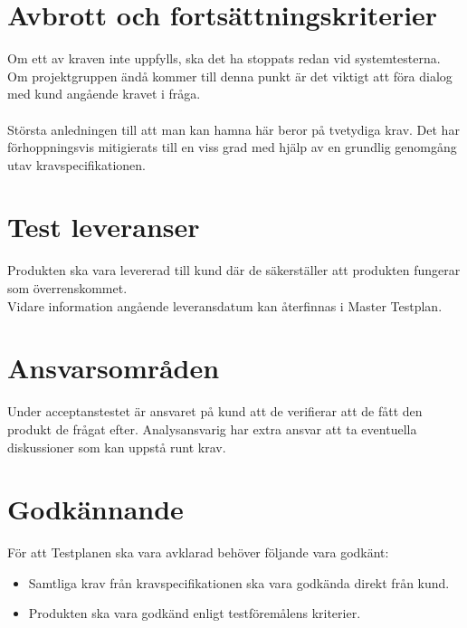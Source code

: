 \documentclass[10pt]{article}
\begin{document}
\section{Avbrott och fortsättningskriterier}
	Om ett av kraven inte uppfylls, ska det ha stoppats redan vid systemtesterna. Om projektgruppen ändå kommer till denna punkt är det viktigt att föra dialog med kund angående kravet i fråga.\\
	\\
	Största anledningen till att man kan hamna här beror på tvetydiga krav. Det har förhoppningsvis mitigierats till en viss grad med hjälp av en grundlig genomgång utav kravspecifikationen.


\section{Test leveranser }
	Produkten ska vara levererad till kund där de säkerställer att produkten fungerar som överrenskommet.
\\	
	Vidare information angående leveransdatum kan återfinnas i Master Testplan.
	

	
\section{Ansvarsområden}
	Under acceptanstestet är ansvaret på kund att de verifierar att de fått den produkt de frågat efter. Analysansvarig har extra ansvar att ta eventuella diskussioner som kan uppstå runt krav.
	

	

	
	
\section{Godkännande}
	För att Testplanen ska vara avklarad behöver följande vara godkänt:
	\begin{itemize}
	 \item Samtliga krav från kravspecifikationen ska vara godkända direkt från kund.
	\item Produkten ska vara godkänd enligt testföremålens kriterier.
	\end{itemize}
	


\printbibliography
\end{document}
